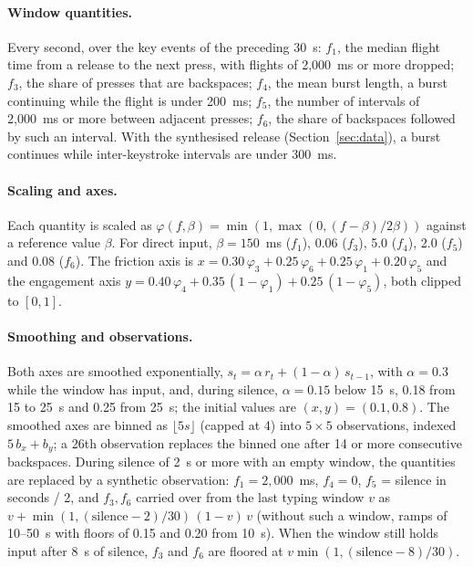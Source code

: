 \paragraph{Window quantities.} Every second, over the key events of the preceding 30~s: $f_1$, the median flight time
from a release to the next press, with flights of 2,000~ms or more dropped; $f_3$, the share of presses that are
backspaces; $f_4$, the mean burst length, a burst continuing while the flight is under 200~ms; $f_5$, the number of
intervals of 2,000~ms or more between adjacent presses; $f_6$, the share of backspaces followed by such an interval.
With the synthesised release (Section~\ref{sec:data}), a burst continues while inter-keystroke intervals are under
300~ms.

\paragraph{Scaling and axes.} Each quantity is scaled as $\varphi(f, \beta) = \min(1, \max(0, (f - \beta) / 2\beta))$
against a reference value $\beta$. For direct input, $\beta = 150$~ms ($f_1$), 0.06 ($f_3$), 5.0 ($f_4$), 2.0 ($f_5$)
and 0.08 ($f_6$). The friction axis is $x = 0.30\,\varphi_3 + 0.25\,\varphi_6 + 0.25\,\varphi_1 + 0.20\,\varphi_5$ and
the engagement axis $y = 0.40\,\varphi_4 + 0.35\,(1 - \varphi_1) + 0.25\,(1 - \varphi_5)$, both clipped to $[0, 1]$.

\paragraph{Smoothing and observations.} Both axes are smoothed exponentially, $s_t = \alpha\,r_t + (1 - \alpha)\,s_{t-1}$,
with $\alpha = 0.3$ while the window has input, and, during silence, $\alpha = 0.15$ below 15~s, 0.18 from 15 to 25~s and
0.25 from 25~s; the initial values are $(x, y) = (0.1, 0.8)$. The smoothed axes are binned as
$\lfloor 5 s \rfloor$ (capped at 4) into $5 \times 5$ observations, indexed $5\,b_x + b_y$; a 26th observation replaces
the binned one after 14 or more consecutive backspaces. During silence of 2~s or more with an empty window, the
quantities are replaced by a synthetic observation: $f_1 = 2{,}000$~ms, $f_4 = 0$, $f_5$ = silence in seconds / 2, and
$f_3, f_6$ carried over from the last typing window $v$ as $v + \min(1, (\mathrm{silence} - 2)/30)\,(1 - v)\,v$ (without
such a window, ramps of 10--50~s with floors of 0.15 and 0.20 from 10~s). When the window still holds input after 8~s
of silence, $f_3$ and $f_6$ are floored at $v \min(1, (\mathrm{silence} - 8)/30)$.

